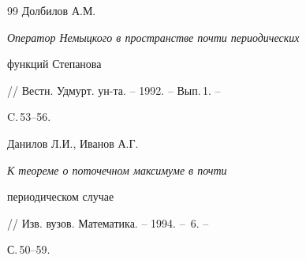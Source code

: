 \begin{thebibliography}{99}
Долбилов А.М. {\em Оператор Немыцкого в пространстве почти периодических


функций Степанова} // Вестн. Удмурт. ун-та. -- 1992. -- Вып.\,1. --


C.\,53--56.




Данилов Л.И., Иванов А.Г. {\em К теореме о поточечном максимуме в почти


периодическом случае} // Изв. вузов. Математика. -- 1994. -- \No\,6. --


С.\,50--59.





\end{thebibliography}





\vskip 2cm














\label{end}





